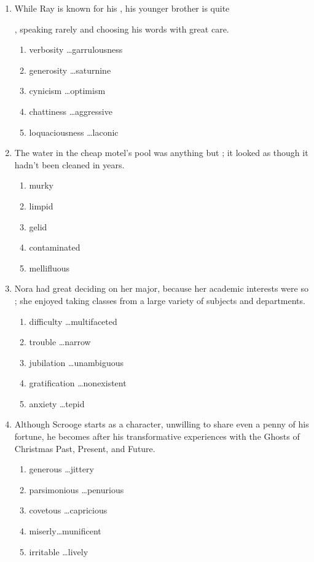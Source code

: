 \documentclass[12pt]{book}
\newcommand{\longline}{\underline{\hspace{2in}} }
\begin{document}
\begin{enumerate}
\newpage
\item While Ray is known for his \longline, his younger brother is quite

\longline, speaking rarely and choosing his words with great care.

\begin{enumerate}[label=(\Alph*)]
\item verbosity \ldots garrulousness
\item generosity \ldots saturnine
\item cynicism \ldots optimism
\item chattiness \ldots aggressive
\item loquaciousness \ldots laconic
\end{enumerate}

\bigskip
\item The water in the cheap motel's pool was anything but \longline; it looked as though it hadn't been cleaned in years.
\begin{enumerate}[label=(\Alph*)]
\item murky
\item limpid
\item gelid
\item contaminated
\item mellifluous
\end{enumerate}

\bigskip
\item Nora had great \longline deciding on her major, because her academic interests were so \longline; she enjoyed taking classes from a large variety of subjects and departments.
\begin{enumerate}[label=(\Alph*)]
\item difficulty \ldots multifaceted
\item trouble \ldots narrow
\item jubilation \ldots unambiguous
\item gratification \ldots nonexistent
\item anxiety \ldots tepid
\end{enumerate}

\newpage
\item Although Scrooge starts as a \longline character, unwilling to share even a penny of his fortune, he becomes \longline after his transformative experiences with the Ghosts of Christmas Past, Present, and Future.
\begin{enumerate}[label=(\Alph*)]
\item generous \ldots jittery
\item parsimonious \ldots penurious
\item covetous \ldots capricious
\item miserly\ldots munificent
\item irritable \ldots lively
\end{enumerate}


\end{enumerate}
\end{document}
